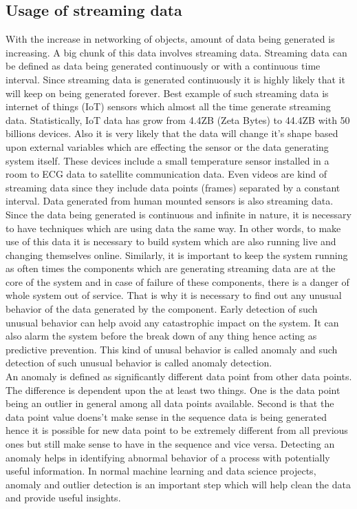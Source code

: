 \documentclass[12pt]{article}
\begin{document}
\subsection{Usage of streaming data}
With the increase in networking of objects, amount of data being generated is increasing. A big chunk of this data involves streaming data. Streaming data can be defined as data being generated continuously or with a continuous time interval. Since streaming data is generated continuously it is highly likely that it will keep on being generated forever. Best example of such streaming data is internet of things (IoT) sensors which almost all the time generate streaming data. Statistically, IoT data has grow from 4.4ZB (Zeta Bytes) to 44.4ZB with 50 billions devices. Also it is very likely that the data will change it's shape based upon external variables which are effecting the sensor or the data generating system itself. These devices include a small temperature sensor installed in a room to ECG data to satellite communication data. Even videos are kind of streaming data since they include data points (frames) separated by a constant interval. Data generated from human mounted sensors is also streaming data. Since the data being generated is continuous and infinite in nature, it is necessary to have techniques which are using data the same way. In other words, to make use of this data it is necessary to build system which are also running live and changing themselves online. Similarly, it is important to keep the system running as often times the components which are generating streaming data are at the core of the system and in case of failure of these components, there is a danger of whole system out of service. That is why it is necessary to find out any unusual behavior of the data generated by the component. Early detection of such unusual behavior can help avoid any catastrophic impact on the system. It can also alarm the system before the break down of any thing hence acting as predictive prevention. This kind of unusal behavior is called anomaly and such detection of such unusual behavior is called anomaly detection.\\
\break
An anomaly is defined as significantly different data point from other data points. The difference is dependent upon the at least two things. One is the data point being an outlier in general among all data points available. Second is that the data point value doens't make sense in the sequence data is being generated hence it is possible for new data point to be extremely different from all previous ones but still make sense to have in the sequence and vice versa. Detecting an anomaly helps in identifying abnormal behavior of a process with potentially useful information. In normal machine learning and data science projects, anomaly and outlier detection is an important step which will help clean the data and provide useful insights. \\
\end{document}
